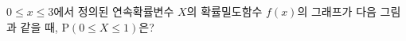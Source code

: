 $0\le x\le 3$에서 정의된 연속확률변수 $X$의 확률밀도함수 $f(x)$의 그래프가 다음 그림과 같을 때, $\mathrm{P}(0\le X\le 1)$은? 
\par\smallskip\begin{center}\resizebox{\ifdim\width>\linewidth\linewidth\else\width\fi}{!}{}\end{center}
